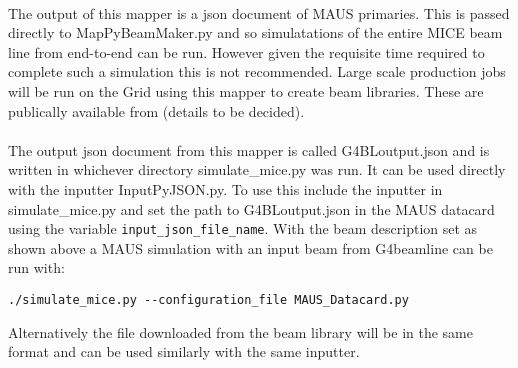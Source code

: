 \paragraph{}

The output of this mapper is a json document of MAUS primaries. This is passed directly to MapPyBeamMaker.py and so simulatations of the entire MICE beam line from end-to-end can be run. However given the requisite time required to complete such a simulation this is not recommended. Large scale production jobs will be run on the Grid using this mapper to create beam libraries. These are publically available from (details to be decided).  

\paragraph{}

The output json document from this mapper is called G4BLoutput.json and is  written in whichever directory simulate\_mice.py was run. It can be used directly with the inputter InputPyJSON.py. To use this include the inputter in simulate\_mice.py and set the path to G4BLoutput.json in the MAUS datacard using the variable \verb+input_json_file_name+. With the beam description set as shown above a MAUS simulation with an input beam from G4beamline can be run with:

\begin{verbatim}
./simulate_mice.py --configuration_file MAUS_Datacard.py
\end{verbatim}

Alternatively the file downloaded from the beam library will be in the same format and can be used similarly with the same inputter.



















